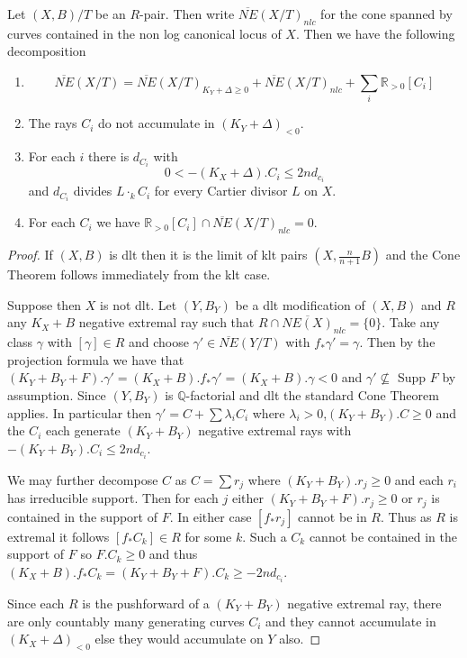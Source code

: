 \documentclass[a4paper,12pt]{book}
\begin{document}
	\begin{theorem}\label{WCT}
	Let $(X,B)/T$ be an $R$-pair. Then write $\overline{NE}(X/T)_{nlc}$ for the cone spanned by curves contained in the non log canonical locus of $X$. Then we have the following decomposition
	
		\begin{enumerate}
		\item $$\overline{NE}(X/T)=\overline{NE}(X/T)_{K_{Y}+\Delta \geq 0} +\overline{NE}(X/T)_{nlc}+ \sum_{i} \mathbb{R}_{>0}[C_{i}]$$
		\item The rays $C_{i}$ do not accumulate in $(K_{Y}+\Delta)_{<0}$.
		\item For each $i$ there is $d_{C_{i}}$ with 
		\[0 < -(K_{X}+\Delta).C_{i} \leq 2nd_{c_{i}}\]
		and $d_{C_{i}}$ divides $L\cdot_{k}C_{i}$ for every Cartier divisor $L$ on $X$.
		\item For each $C_{i}$ we have $\mathbb{R}_{>0}[C_{i}] \cap \overline{NE}(X/T)_{nlc} = {0}$.
	\end{enumerate}

	
\end{theorem}
\begin{proof}
	If $(X,B)$ is dlt then it is the limit of klt pairs $(X,\frac{n}{n+1}B)$ and the Cone Theorem follows immediately from the klt case.
	
	Suppose then $X$ is not dlt. Let $(Y,B_{Y})$ be a dlt modification of $(X,B)$ and $R$ any $K_{X}+B$ negative extremal ray such that $R \cap\overline{NE(X)}_{nlc}=\{0\}$. Take any class $\gamma$ with $[\gamma] \in R$ and choose $\gamma' \in \overline{NE}(Y/T)$ with $f_{*}\gamma'=\gamma$. Then by the projection formula we have that $(K_{Y}+B_{Y}+F).\gamma'=(K_{X}+B).f_{*}\gamma'=(K_{X}+B).\gamma < 0$ and $\gamma' \not\subseteq$ Supp $F$ by assumption. 
	Since $(Y,B_{Y})$ is $\mathbb{Q}$-factorial and dlt the standard Cone Theorem applies. In particular then $\gamma'=C+ \sum \lambda_{i}C_{i}$ where $\lambda_{i} >0$,$(K_{Y}+B_{Y}).C \geq 0$ and the $C_{i}$ each generate $(K_{Y}+B_{Y})$ negative extremal rays with $-(K_{Y}+B_{Y}).C_{i} \leq 2nd_{c_{i}}$. 
	
	We may further decompose $C$ as $C=\sum r_{j}$ where $(K_{Y}+B_{Y}).r_{j} \geq 0$ and each $r_{i}$ has irreducible support. Then for each $j$ either $(K_{Y}+B_{Y}+F).r_{j} \geq 0$ or $r_{j}$ is contained in the support of $F$. In either case $[f_{*}r_{j}]$ cannot be in $R$. Thus as $R$ is extremal it follows $[f_{*}C_{k}] \in R$ for some $k$. Such a $C_{k}$ cannot be contained in the support of $F$ so $F.C_{k} \geq 0$ and thus $(K_{X}+B).f_{*}C_{k}=(K_{Y}+B_{Y}+F).C_{k} \geq -2nd_{c_{i}}$.
	
	Since each $R$ is the pushforward of a $(K_{Y}+B_{Y})$ negative extremal ray, there are only countably many generating curves $C_{i}$ and they cannot accumulate in $(K_{X}+\Delta)_{< 0}$ else they would accumulate on $Y$ also.
\end{proof}
\end{document}

